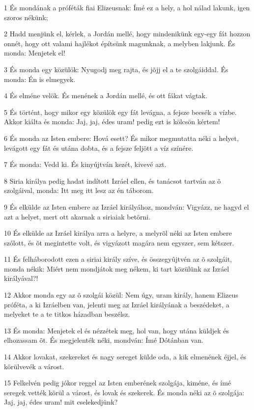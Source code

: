 \par 1 És mondának a próféták fiai Elizeusnak: Ímé ez a hely, a hol nálad lakunk, igen szoros nékünk;
\par 2 Hadd menjünk el, kérlek, a Jordán mellé, hogy mindenikünk egy-egy fát hozzon onnét, hogy ott valami hajlékot építsünk magunknak, a melyben lakjunk. És monda: Menjetek el!
\par 3 És monda egy közülök: Nyugodj meg rajta, és jõjj el a te szolgáiddal. És monda: Én is elmegyek.
\par 4 És elméne velök. És menének a Jordán mellé, és ott fákat vágtak.
\par 5 És történt, hogy mikor egy közülök egy fát levágna, a fejsze beesék a vízbe. Akkor kiálta és monda: Jaj, jaj, édes uram! pedig ezt is kölcsön kértem!
\par 6 És monda az Isten embere: Hová esett? És mikor megmutatta néki a helyet, levágott egy fát és utána dobta, és a fejsze feljött a víz színére.
\par 7 És monda: Vedd ki. És kinyújtván kezét, kivevé azt.
\par 8 Siria királya pedig hadat indított Izráel ellen, és tanácsot tartván az õ szolgáival, monda: Itt meg itt lesz az én táborom.
\par 9 És elkülde az Isten embere az Izráel királyához, mondván: Vigyázz, ne hagyd el azt a helyet, mert ott akarnak a siriaiak betörni.
\par 10 És elkülde az Izráel királya arra a helyre, a melyrõl néki az Isten embere szólott, és õt megintette volt, és vigyázott magára nem egyszer, sem kétszer.
\par 11 És felháborodott ezen a siriai király szíve, és összegyûjtvén az õ szolgáit, monda nékik: Miért nem mondjátok meg nékem, ki tart közülünk az Izráel királyával?!
\par 12 Akkor monda egy az õ szolgái közül: Nem úgy, uram király, hanem Elizeus próféta, a ki Izráelben van, jelenti meg az Izráel királyának a beszédeket, a melyeket te a te titkos házadban beszélsz.
\par 13 És monda: Menjetek el és nézzétek meg, hol van, hogy utána küldjek és elhozassam õt. És megjelenték néki, mondván: Ímé Dótánban van.
\par 14 Akkor lovakat, szekereket és nagy sereget külde oda, a kik elmenének éjjel, és körülvevék a várost.
\par 15 Felkelvén pedig jókor reggel az Isten emberének szolgája, kiméne, és ímé seregek vették körül a várost, és lovak és szekerek. És monda néki az õ szolgája: Jaj, jaj, édes uram! mit cselekedjünk?
